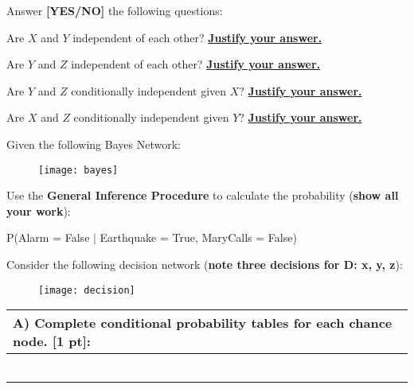\documentclass[assignment={3},
	duedate={Sunday, March 31, 2024, 11:59 PM CST},
	points={80},
	type={Written},
	template=true
]{cs581homework}
\newcommand{\justify}{\textbf{\underline{Justify your answer.}}}
\begin{document}
\noindent Answer \textbf{[YES/NO]} the following questions:
\begin{enumerate}[label=\alph*) \textbf{[2.5 pt]},start=6]
	\item Are $X$ and $Y$ independent of each other? \justify
	\begin{answerbox}
	\end{answerbox}
	\item Are $Y$ and $Z$ independent of each other? \justify
	\begin{answerbox}
	\end{answerbox}
	\item Are $Y$ and $Z$ conditionally independent given $X$? \justify
	\begin{answerbox}
	\end{answerbox}
	\item Are $X$ and $Z$ conditionally independent given $Y$? \justify
	\begin{answerbox}
	\end{answerbox}
\end{enumerate}

Given the following Bayes Network:
\begin{figure}[H]
	\centering
	\texttt{[image: bayes]}
	\label{fig:bayes}
\end{figure}
Use the \textbf{General Inference Procedure} to calculate the probability (\textbf{show all your work}):
\begin{center} P(Alarm = False $|$ Earthquake = True, MaryCalls = False) \end{center}
\begin{answerbox}
\end{answerbox}

Consider the following decision network (\textbf{note three decisions for D: x, y, z}):
\begin{figure}[H]
	\centering
	\texttt{[image: decision]}
	\label{fig:decision}
\end{figure}

\begin{table}[H]
	\centering
	\begin{tabular}{|p{\textwidth}|}
		\hline
		\textbf{A) Complete conditional probability tables for each chance node. [1 pt]:}\\
		\hline
		\iftemplate
		\vspace*{1in}~\\
		\else
		\fi
		\hline
	\end{tabular}
\end{table}
\end{document}
